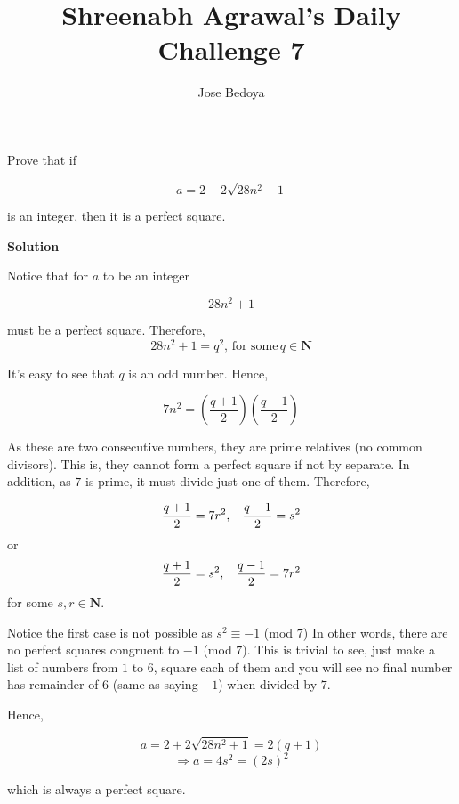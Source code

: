 \documentclass{article}
\begin{document}
\title{Shreenabh Agrawal's Daily Challenge 7}
\author{Jose Bedoya}
\maketitle
{\normalsize
\vspace{10mm}

Prove that if 

$$a = 2+2\sqrt{28n^2+1}$$

is an integer, then it is a perfect square.

\vspace{7mm}
\textbf{Solution}

\vspace{5mm}
Notice that for $a$ to be an integer

$$28n^2+1$$

must be a perfect square.
Therefore,
$$28n^2+1 = q^2, \, \mbox{for some} \, q \in \textbf{N}$$

It's easy to see that $q$ is an odd number. Hence,

$$7n^2= \left(\frac{q+1}{2}\right)\left(\frac{q-1}{2}\right)$$

As these are two consecutive numbers, they are prime relatives (no common divisors). This is, they cannot form a perfect square if not by separate. In addition, as $7$ is prime, it must divide just one of them. Therefore,

$$\frac{q+1}{2}= 7r^2,\hspace{3mm} \frac{q-1}{2}=s^2$$
or
\vspace{2mm}
$$\frac{q+1}{2}= s^2,\hspace{3mm} \frac{q-1}{2}=7r^2$$
for some $s, r \in \textbf{N}$.

\vspace{3mm}
Notice the first case is not possible as $s^2 \equiv -1$ (mod $7$)
In other words, there are no perfect squares congruent to $-1$ (mod $7$). This is trivial to see, just make a list of numbers from $1$ to $6$, square each of them and you will see no final number has remainder of $6$ (same as saying $-1$) when divided by $7$.

\vspace{5mm} 
Hence,

$$a = 2+2\sqrt{28n^2+1} = 2(q+1)$$
$$\Rightarrow a = 4s^2 = (2s)^2$$

which is always a perfect square.
}
\end{document}
